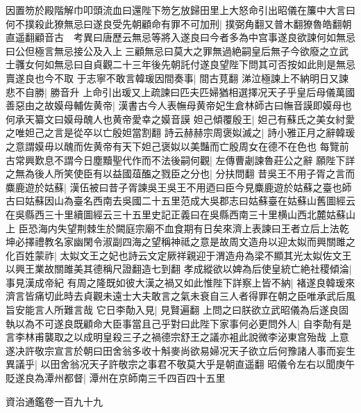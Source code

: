 因置笏於殿階解巾叩頭流血曰還陛下笏乞放歸田里上大怒命引出昭儀在簾中大言曰何不撲殺此獠無忌曰遂良受先朝顧命有罪不可加刑|{
	撲弼角翻又普木翻獠魯皓翻朝直遥翻顧音古　考異曰唐歷云無忌等將入遂良曰今者多為中宫事遂良欲諫何如無忌曰公但極言無忌接公及入上三顧無忌曰莫大之罪無過絶嗣皇后無子今欲廢之立武士彠女何如無忌曰自貞觀二十三年後先朝託付遂良望陛下問其可否按如此則是無忌賣遂良也今不取}
于志寧不敢言韓瑗因間奏事|{
	間古莧翻}
涕泣極諫上不納明日又諫悲不自勝|{
	勝音升}
上命引出瑗又上疏諫曰匹夫匹婦猶相選擇况天子乎皇后母儀萬國善惡由之故嫫母輔佐黄帝|{
	漢書古今人表幠母黄帝妃生倉林師古曰幠音謨即嫫母也何承天纂文曰嫫母醜人也黄帝愛幸之嫫音謨}
妲己傾覆殷王|{
	妲己有蘇氏之美女紂愛之唯妲己之言是從卒以亡殷妲當割翻}
詩云赫赫宗周褒姒滅之|{
	詩小雅正月之辭韓瑗之意謂嫫毋以醜而佐黄帝有天下妲己褒姒以美豔而亡殷周女在德不在色也}
每覽前古常興歎息不謂今日塵黷聖代作而不法後嗣何觀|{
	左傳曹劌諫魯莊公之辭}
願陛下詳之無為後人所笑使臣有以益國葅醢之戮臣之分也|{
	分扶問翻}
昔吳王不用子胥之言而麋鹿遊於姑蘇|{
	漢伍被曰昔子胥諫吳王吳王不用迺曰臣今見麋鹿遊於姑蘇之臺也師古曰姑蘇因山為臺名西南去吳國二十五里范成大吳郡志曰姑蘇臺在姑蘇山舊圖經云在吳縣西三十里續圖經云三十五里史記正義曰在吳縣西南三十里横山西北麓姑蘇山上}
臣恐海内失望荆棘生於闕庭宗廟不血食期有日矣來濟上表諫曰王者立后上法乾坤必擇禮教名家幽閑令淑副四海之望稱神祗之意是故周文造舟以迎太姒而興關雎之化百姓蒙祚|{
	太姒文王之妃也詩云文定厥祥親迎于渭造舟為梁不顯其光太姒佐文王以興王業故關雎美其德稱尺證翻造七到翻}
孝成縱欲以婢為后使皇統亡絶社稷傾淪|{
	事見漢成帝紀}
有周之隆既如彼大漢之禍又如此惟陛下詳察上皆不納|{
	褚遂良韓瑗來濟言皆痛切此時去貞觀未遠士大夫敢言之氣未衰自三人者得罪在朝之臣唯承武后風旨安能言人所難言哉}
它日李勣入見|{
	見賢遍翻}
上問之曰朕欲立武昭儀為后遂良固執以為不可遂良既顧命大臣事當且己乎對曰此陛下家事何必更問外人|{
	自李勣有是言李林甫襲取之以成明皇殺三子之禍德宗舒王之議亦袓此說微李泌東宫殆哉}
上意遂决許敬宗宣言於朝曰田舍翁多收十斛麥尚欲易婦况天子欲立后何豫諸人事而妄生異議乎|{
	以田舍翁况天子許敬宗之事君不敬莫大乎是朝直遥翻}
昭儀令左右以聞庚午貶遂良為潭州都督|{
	潭州在京師南三千四百四十五里}


資治通鑑卷一百九十九
